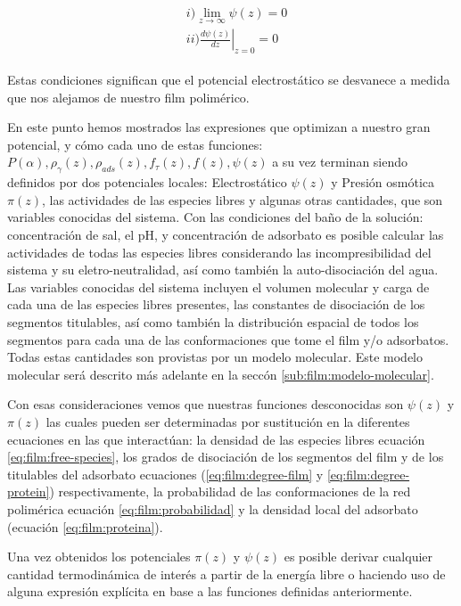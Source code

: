 \begin{align}
	\begin{aligned}
		&i)  \lim_{z\to\infty}\psi(z) = 0 \\
		&ii) \left.\frac{d\psi(z)}{dz}\right|_{z=0} = 0
		\label{eq:film:contorno}
	\end{aligned}
\end{align}

Estas condiciones significan que el potencial electrost\'atico se desvanece a medida que nos alejamos de nuestro film polim\'erico.

En este punto hemos mostrados las expresiones que optimizan a nuestro gran potencial, y c\'omo cada uno de estas funciones: $P(\alpha), \rho_\gamma(z),\rho_{ads}(z), f_\tau(z), f(z), \psi(z) $ a su vez  terminan siendo definidos por dos potenciales locales: Electrost\'atico $\psi(z)$ y Presi\'on osm\'otica $\pi(z)$, las actividades de las especies libres y algunas otras cantidades, que son variables conocidas del sistema.
Con las condiciones del ba\~no de la soluci\'on: concentraci\'on de sal, el pH, y concentraci\'on de adsorbato es posible calcular las actividades de todas las especies libres considerando las incompresibilidad del sistema y su eletro-neutralidad, as\'i como tambi\'en la auto-disociaci\'on del agua.  
Las variables conocidas del sistema incluyen el volumen molecular y carga de cada una de las especies libres presentes, las constantes de disociaci\'on de los segmentos titulables, as\'i como tambi\'en la distribuci\'on espacial de todos los segmentos para cada una de las conformaciones que tome el film y/o adsorbatos. Todas estas cantidades son provistas por un modelo molecular. Este modelo molecular ser\'a descrito m\'as adelante en la secc\'on \ref{sub:film:modelo-molecular}.

Con esas consideraciones vemos que nuestras funciones desconocidas son  $\psi(z)$ y $\pi(z)$ las cuales pueden ser determinadas por sustituci\'on en la diferentes ecuaciones en las que interact\'uan: la densidad de las especies libres ecuaci\'on  \ref{eq:film:free-species}, los grados de disociaci\'on de los segmentos del film y de los  titulables del adsorbato ecuaciones (\ref{eq:film:degree-film} y \ref{eq:film:degree-protein}) respectivamente, la probabilidad de las conformaciones de la red polim\'erica ecuaci\'on \ref{eq:film:probabilidad} y la densidad local del adsorbato (ecuaci\'on \ref{eq:film:proteina}).

Una vez obtenidos los potenciales $\pi(z)$ y $\psi(z)$ es posible derivar  cualquier cantidad termodin\'amica de inter\'es  a partir de la energ\'ia libre o haciendo uso de alguna expresi\'on expl\'icita en base a las funciones definidas anteriormente.

